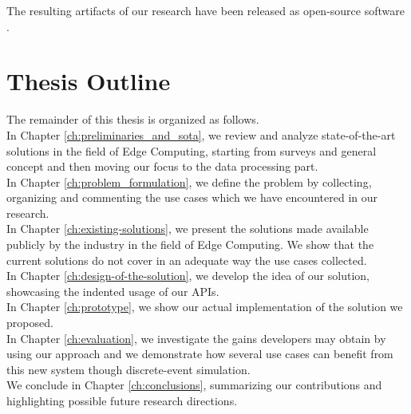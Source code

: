 The resulting artifacts of our research have been released as open-source software \cite{thesis-github}.


\section{Thesis Outline}
The remainder of this thesis is organized as follows.\\
In Chapter \ref{ch:preliminaries_and_sota}, we review and analyze state-of-the-art solutions in the field of Edge Computing, starting from surveys and general concept and then moving our focus to the data processing part.\\
In Chapter \ref{ch:problem_formulation}, we define the problem by collecting, organizing and commenting the use cases which we have encountered in our research.\\
In Chapter \ref{ch:existing-solutions}, we present the solutions made available publicly by the industry in the field of Edge Computing. We show that the current solutions do not cover in an adequate way the use cases collected.\\
In Chapter \ref{ch:design-of-the-solution}, we develop the idea of our solution, showcasing the indented usage of our APIs.\\
In Chapter \ref{ch:prototype}, we show our actual implementation of the solution we proposed.\\
In Chapter \ref{ch:evaluation}, we investigate the gains developers may obtain by using our approach and we demonstrate how several use cases can benefit from this new system though discrete-event simulation.\\
We conclude in Chapter \ref{ch:conclusions}, summarizing our contributions and highlighting possible future research directions.



\iffalse
\begin{example}
The thesis is structured in the following way:
\begin{itemize}
\item In \autoref{ch:preliminaries_and_sota}, we present ... .
\item In \autoref{ch:problem_formulation}, we formulate the problem we address in the thesis and ... .
\item In \autoref{ch:design}, we present our solution for ... .
\item In \autoref{ch:experiments}, we show experimental results of our proposed methods in different settings ... .
\item Finally, in \autoref{ch:conclusions}, we present our conclusions and possible future paths toward which our work could be extended.
\end{itemize}
\end{example}
\fi